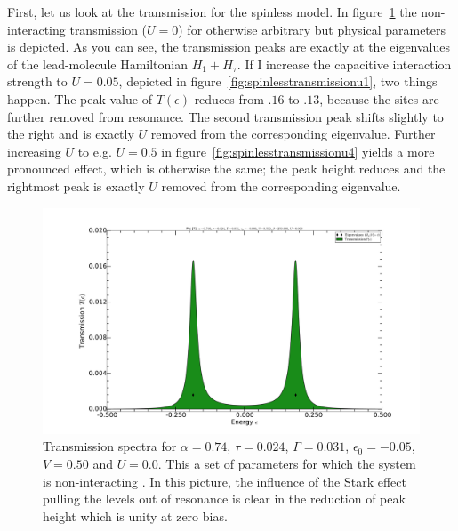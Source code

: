 First, let us look at the transmission for the spinless model. In figure~\ref{fig:spinlesstransmissionu0} the non\hyp{}interacting transmission ($U=0$) for otherwise arbitrary but physical parameters is depicted. As you can see, the transmission peaks are exactly at the eigenvalues of the lead-molecule Hamiltonian $H_1 + H_\tau$. If I increase the capacitive interaction strength to $U=0.05$, depicted in figure~\ref{fig:spinlesstransmissionu1}, two things happen. The peak value of $T(\epsilon)$ reduces from $.16$ to $.13$, because the sites are further removed from resonance. The second transmission peak shifts slightly to the right and is exactly $U$ removed from the corresponding eigenvalue. Further increasing $U$ to e.g. $U=0.5$ in figure~\ref{fig:spinlesstransmissionu4} yields a more pronounced effect, which is otherwise the same; the peak height reduces and the rightmost peak is exactly $U$ removed from the corresponding eigenvalue.
\begin{figure}[!bt]
    \centering
    \includegraphics[height=.35\textheight,clip=true,trim=7cm 2cm 7cm 4cm]{pdf/trans/decospinlesstransmissionarbitraryu0.pdf}
    \caption{Transmission spectra for $\alpha=0.74$, $\tau=0.024$, $\Gamma=0.031$, $\epsilon_0 = - 0.05$, $V=0.50$ and $U=0.0$. This a set of parameters for which the system is non\hyp{}interacting . In this picture, the influence of the Stark effect pulling the levels out of resonance is clear in the reduction of peak height which is unity at zero bias.}
    \label{fig:spinlesstransmissionu0}
\end{figure}
